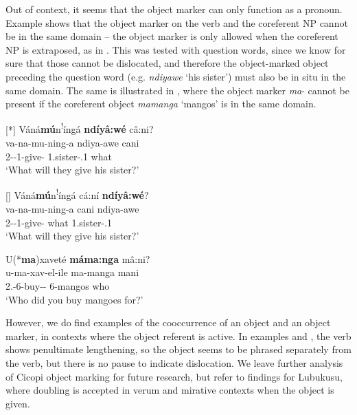 \documentclass[output=paper]{langscibook}
\begin{document}
Out of context, it seems that the object marker can only function as a pronoun. Example  shows that the object marker on the verb and the coreferent NP cannot be in the same domain – the object marker is only allowed when the coreferent NP is extraposed, as in . This was tested with question words, since we know for sure that those cannot be dislocated, and therefore the object-marked object preceding the question word (e.g. \textit{ndiyawe} ‘his sister’) must also be in situ in the same domain. The same is illustrated in , where the object marker \textit{ma}\nobreakdash- cannot be present if the coreferent object \textit{mamanga} ‘mangos’ is in the same domain. 

\ea\label{bkm:Ref127267640}
\ea
[*]{
\label{bkm:Ref127267640:a}
Váná\textbf{mú}n\textsuperscript{!}íngá \textbf{ndíyâ:wé} câ:ni?\\
\gll
va-na-mu-ning-a  ndiya-awe  cani\\
2\SM{}-\FUT{}-1\OM{}-give-\FV{}  1.sister-\POSS{}.1  what\\
\glt
‘What will they give his sister?’\\
}


\ex
[]{
\label{bkm:Ref127267640:b}
Váná\textbf{mú}n\textsuperscript{!}íngá cá:ní \textbf{ndíyâ:wé}?\\
\gll
va-na-mu-ning-a  cani  ndiya-awe\\
2\SM{}-\FUT{}-1\OM{}-give-\FV{}  what  1.sister-\POSS{}.1\\
\glt
‘What will they give his sister?’\\
}

\z

\ex
\label{bkm:Ref141373727}
U(*\textbf{ma})xaveté \textbf{máma:nga} mâ:ni?\\
\gll
u-ma-xav-el-ile  ma-manga  mani\\
2\SG.\SM{}-6\OM{}-buy-\APPL{}-\PFV{}  6-mangos  who\\
\glt
‘Who did you buy mangoes for?’\\

\z

However, we do find examples of the cooccurrence of an object and an object marker, in contexts where the object referent is active. In examples  and , the verb shows penultimate lengthening, so the object seems to be phrased separately from the verb, but there is no pause to indicate dislocation. We leave further analysis of Cicopi object marking for future research, but refer to  findings for Lubukusu, where doubling is accepted in verum and mirative contexts when the object is given.\largerpage
\end{document}

